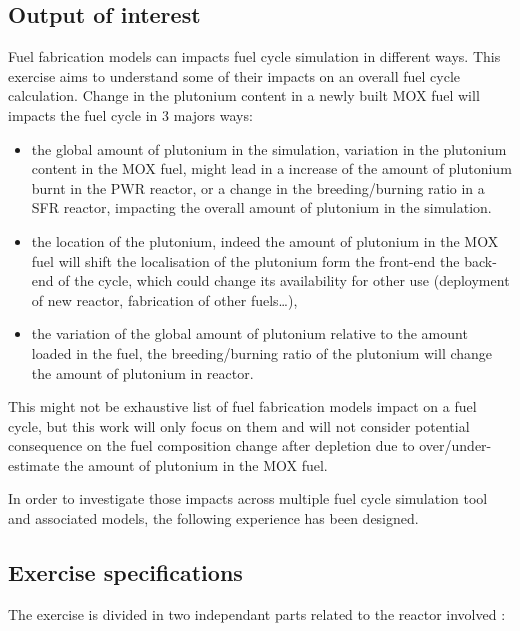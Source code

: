 \subsection{Output of interest}

Fuel fabrication models can impacts fuel cycle simulation in different ways.
This exercise aims to understand some of their impacts on an overall fuel cycle
calculation. Change in the plutonium content in a newly built MOX fuel will
impacts the fuel cycle in 3 majors ways:

\begin{itemize}
    \item the global amount of plutonium in the simulation, variation in the
        plutonium content in the MOX fuel, might lead in a increase of the
        amount of plutonium burnt in the PWR reactor, or a change in the
        breeding/burning ratio in a SFR reactor, impacting the overall amount of
        plutonium in the simulation.
    \item the location of the plutonium, indeed the amount of plutonium in the
        MOX fuel will shift the localisation of the plutonium form the front-end
        the back-end of the cycle, which could change its availability for
        other use (deployment of new reactor, fabrication of other fuels\ldots),
    \item the variation of the global amount of plutonium relative to the amount
        loaded in the fuel, the breeding/burning ratio of the plutonium will
        change the amount of plutonium in reactor.
\end{itemize}

This might not be exhaustive list of fuel fabrication models impact on a fuel
cycle, but this work will only focus on them and will not consider potential
consequence on the fuel composition change after depletion due to
over/under-estimate the amount of plutonium in the MOX fuel.

In order to investigate those impacts across multiple fuel cycle simulation tool
and associated models, the following experience has been designed.

\subsection{Exercise specifications}

The exercise is divided in two independant parts related to the reactor involved : 


